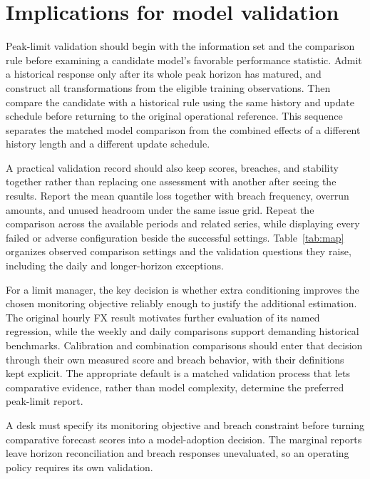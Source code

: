 \documentclass[11pt,a4paper]{article}
\begin{document}
\FloatBarrier

\section{Implications for model validation}\label{sec:implications}

Peak-limit validation should begin with the information set and the comparison rule before examining a candidate model's favorable performance statistic. Admit a historical response only after its whole peak horizon has matured, and construct all transformations from the eligible training observations. Then compare the candidate with a historical rule using the same history and update schedule before returning to the original operational reference. This sequence separates the matched model comparison from the combined effects of a different history length and a different update schedule.


A practical validation record should also keep scores, breaches, and stability together rather than replacing one assessment with another after seeing the results. Report the mean quantile loss together with breach frequency, overrun amounts, and unused headroom under the same issue grid. Repeat the comparison across the available periods and related series, while displaying every failed or adverse configuration beside the successful settings. Table~\ref{tab:map} organizes observed comparison settings and the validation questions they raise, including the daily and longer-horizon exceptions.


For a limit manager, the key decision is whether extra conditioning improves the chosen monitoring objective reliably enough to justify the additional estimation. The original hourly FX result motivates further evaluation of its named regression, while the weekly and daily comparisons support demanding historical benchmarks. Calibration and combination comparisons should enter that decision through their own measured score and breach behavior, with their definitions kept explicit. The appropriate default is a matched validation process that lets comparative evidence, rather than model complexity, determine the preferred peak-limit report.

A desk must specify its monitoring objective and breach constraint before turning comparative forecast scores into a model-adoption decision. The marginal reports leave horizon reconciliation and breach responses unevaluated, so an operating policy requires its own validation.
\end{document}
